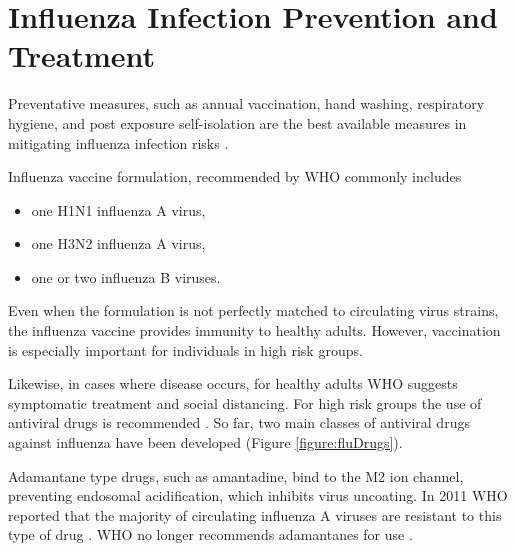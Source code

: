 \section{Influenza Infection Prevention and Treatment}

Preventative measures, such as annual vaccination, hand washing, respiratory hygiene, and post exposure self-isolation are the best available measures in mitigating influenza infection risks \cite{influenza_seasonal_2018}.

Influenza vaccine formulation, recommended by WHO commonly includes \cite{RecommendedCompositionVaccines}

\begin{itemize}
    \item one H1N1 influenza A virus,
    \item one H3N2 influenza A virus,
    \item one or two influenza B viruses.
\end{itemize}

Even when the formulation is not perfectly matched to circulating virus strains, the influenza vaccine provides immunity to healthy adults. However, vaccination is especially important for individuals in high risk groups.

Likewise, in cases where disease occurs, for healthy adults WHO suggests symptomatic treatment and social distancing. For high risk groups the use of antiviral drugs is recommended \cite{influenza_seasonal_2018}. So far, two main classes of antiviral drugs against influenza have been developed (Figure \ref{figure:fluDrugs}).

Adamantane type drugs, such as amantadine, bind to the M2 ion channel, preventing endosomal acidification, which inhibits virus uncoating. In 2011 WHO reported that the majority of circulating influenza A viruses are resistant to this type of drug \cite{whoAntivirals2011}. WHO no longer recommends adamantanes for use \cite{influenza_seasonal_2018}.

